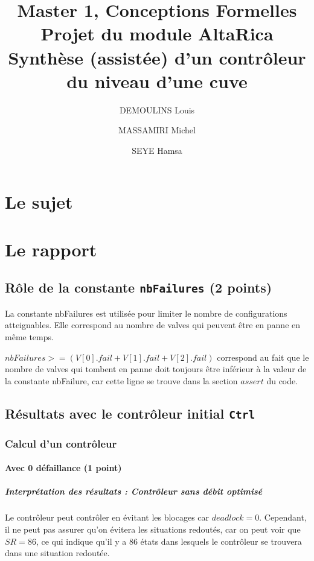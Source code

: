 \documentclass[a4paper]{book}
\newcommand{\altarica}{{\sc AltaRica}}
\begin{document}
\title{Master 1, Conceptions Formelles\\
Projet du module \altarica\\
Synthèse (assistée) d'un contrôleur du niveau d'une cuve}

\date{}

\author{DEMOULINS Louis \and MASSAMIRI Michel \and SEYE Hamsa}

\maketitle

\chapter{Le sujet}


\chapter{Le rapport}
\section{Rôle de la constante {\tt nbFailures} (2 points)}
La constante nbFailures est utilisée pour limiter le nombre de configurations atteignables. Elle correspond au nombre de valves qui peuvent être en panne en même temps.

$nbFailures >= (V[0].fail + V[1].fail + V[2].fail)$ correspond au fait que le nombre de valves qui tombent en panne doit toujours être inférieur à la valeur de la constante nbFailure, car cette ligne se trouve dans la section $assert$ du code.

\section{Résultats avec le contrôleur initial {\tt Ctrl}}
\subsection{Calcul d'un contrôleur}
\subsubsection{Avec 0 défaillance (1 point)}


%
%
%
\paragraph{Interprétation des résultats : Contrôleur sans débit optimisé}
Le contrôleur peut contrôler en évitant les blocages car $deadlock = 0$. Cependant, il ne peut pas assurer qu'on évitera les situations redoutés,
car on peut voir que $SR = 86$, ce qui indique qu'il y a $86$ états dans lesquels le contrôleur se trouvera dans une situation redoutée.
\end{document}
